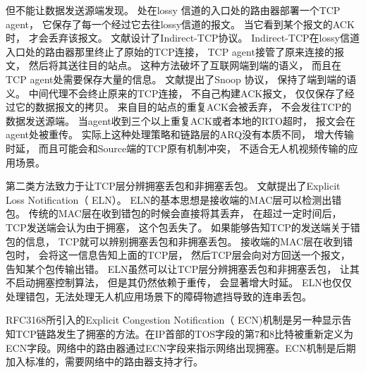 但不能让数据发送源端发现。
处在lossy 信道的入口处的路由器部署一个TCP agent，
它保存了每一个经过它去往lossy信道的报文。
当它看到某个报文的ACK时，
才会丢弃该报文。
文献\cite{Bakre1995I}设计了Indirect-TCP协议。
Indirect-TCP在lossy信道入口处的路由器那里终止了原始的TCP连接，
TCP agent接管了原来连接的报文，
然后将其送往目的站点。
这种方法破坏了互联网端到端的语义，
而且在TCP agent处需要保存大量的信息。
文献\cite{Balakrishnan1995Improving}提出了Snoop 协议，
保持了端到端的语义。
中间代理不会终止原来的TCP连接，
不自己构建ACK报文，
仅仅保存了经过它的数据报文的拷贝。
来自目的站点的重复ACK会被丢弃，
不会发往TCP的数据发送源端。
当agent收到三个以上重复ACK或者本地的RTO超时，
报文会在agent处被重传。
实际上这种处理策略和链路层的ARQ没有本质不同，
增大传输时延，
而且可能会和Source端的TCP原有机制冲突，
不适合无人机视频传输的应用场景。
\par
第二类方法致力于让TCP层分辨拥塞丢包和非拥塞丢包。
文献\cite{buchholcz2003explicit}提出了Explicit Loss Notification（ ELN）。
ELN的基本思想是接收端的MAC层可以检测出错包。
传统的MAC层在收到错包的时候会直接将其丢弃，
在超过一定时间后，
TCP发送端会认为由于拥塞，
这个包丢失了。
如果能够告知TCP的发送端关于错包的信息，
TCP就可以辨别拥塞丢包和非拥塞丢包。
接收端的MAC层在收到错包时，
会将这一信息告知上面的TCP层，
然后TCP层会向对方回送一个报文，
告知某个包传输出错。
ELN虽然可以让TCP层分辨拥塞丢包和非拥塞丢包，
让其不启动拥塞控制算法，
但是其仍然依赖于重传，
会显著增大时延。
ELN也仅仅处理错包，无法处理无人机应用场景下的障碍物遮挡导致的连串丢包。
\par
RFC3168所引入的Explicit Congestion Notification（ ECN)机制\textsuperscript{\cite{ramakrishnan2001rfc}}是另一种显示告知TCP链路发生了拥塞的方法。在IP首部的TOS字段的第7和8比特被重新定义为ECN字段。网络中的路由器通过ECN字段来指示网络出现拥塞。ECN机制是后期加入标准的，需要网络中的路由器支持才行。
\par
